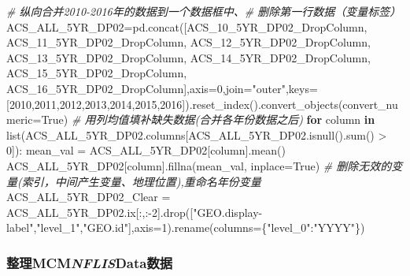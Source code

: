 \documentclass[
]{article}
\newenvironment{Shaded}{}{}
\newcommand{\BuiltInTok}[1]{#1}
\newcommand{\CommentTok}[1]{\textcolor[rgb]{0.38,0.63,0.69}{\textit{#1}}}
\newcommand{\ControlFlowTok}[1]{\textcolor[rgb]{0.00,0.44,0.13}{\textbf{#1}}}
\newcommand{\DecValTok}[1]{\textcolor[rgb]{0.25,0.63,0.44}{#1}}
\newcommand{\KeywordTok}[1]{\textcolor[rgb]{0.00,0.44,0.13}{\textbf{#1}}}
\newcommand{\NormalTok}[1]{#1}
\newcommand{\OperatorTok}[1]{\textcolor[rgb]{0.40,0.40,0.40}{#1}}
\newcommand{\StringTok}[1]{\textcolor[rgb]{0.25,0.44,0.63}{#1}}
\newcommand{\VariableTok}[1]{\textcolor[rgb]{0.10,0.09,0.49}{#1}}
\begin{document}
\begin{Shaded}
\begin{Highlighting}[]
\CommentTok{\# 纵向合并2010{-}2016年的数据到一个数据框中、\# 删除第一行数据（变量标签）}
\NormalTok{ACS\_ALL\_5YR\_DP02}\OperatorTok{=}\NormalTok{pd.concat([ACS\_10\_5YR\_DP02\_DropColumn,}
\NormalTok{                           ACS\_11\_5YR\_DP02\_DropColumn,}
\NormalTok{                           ACS\_12\_5YR\_DP02\_DropColumn,}
\NormalTok{                           ACS\_13\_5YR\_DP02\_DropColumn,}
\NormalTok{                           ACS\_14\_5YR\_DP02\_DropColumn,}
\NormalTok{                           ACS\_15\_5YR\_DP02\_DropColumn,}
\NormalTok{                           ACS\_16\_5YR\_DP02\_DropColumn],axis}\OperatorTok{=}\DecValTok{0}\NormalTok{,join}\OperatorTok{=}\StringTok{"outer"}\NormalTok{,keys}\OperatorTok{=}\NormalTok{[}\DecValTok{2010}\NormalTok{,}\DecValTok{2011}\NormalTok{,}\DecValTok{2012}\NormalTok{,}\DecValTok{2013}\NormalTok{,}\DecValTok{2014}\NormalTok{,}\DecValTok{2015}\NormalTok{,}\DecValTok{2016}\NormalTok{]).reset\_index().convert\_objects(convert\_numeric}\OperatorTok{=}\VariableTok{True}\NormalTok{)}
\CommentTok{\# 用列均值填补缺失数据(合并各年份数据之后)}
\ControlFlowTok{for}\NormalTok{ column }\KeywordTok{in} \BuiltInTok{list}\NormalTok{(ACS\_ALL\_5YR\_DP02.columns[ACS\_ALL\_5YR\_DP02.isnull().}\BuiltInTok{sum}\NormalTok{() }\OperatorTok{\textgreater{}} \DecValTok{0}\NormalTok{]):}
\NormalTok{    mean\_val }\OperatorTok{=}\NormalTok{ ACS\_ALL\_5YR\_DP02[column].mean()}
\NormalTok{    ACS\_ALL\_5YR\_DP02[column].fillna(mean\_val, inplace}\OperatorTok{=}\VariableTok{True}\NormalTok{)}
\CommentTok{\# 删除无效的变量(索引，中间产生变量、地理位置),重命名年份变量}
\NormalTok{ACS\_ALL\_5YR\_DP02\_Clear }\OperatorTok{=}\NormalTok{ ACS\_ALL\_5YR\_DP02.ix[:,:}\OperatorTok{{-}}\DecValTok{2}\NormalTok{].drop([}\StringTok{"GEO.display{-}label"}\NormalTok{,}\StringTok{"level\_1"}\NormalTok{,}\StringTok{"GEO.id"}\NormalTok{],axis}\OperatorTok{=}\DecValTok{1}\NormalTok{).rename(columns}\OperatorTok{=}\NormalTok{\{}\StringTok{"level\_0"}\NormalTok{:}\StringTok{"YYYY"}\NormalTok{\})}
\end{Highlighting}
\end{Shaded}

\hypertarget{header-n210}{%
\subsubsection{\texorpdfstring{整理MCM\emph{NFLIS}Data数据}{整理MCMNFLISData数据}}\label{header-n210}}
\end{document}
